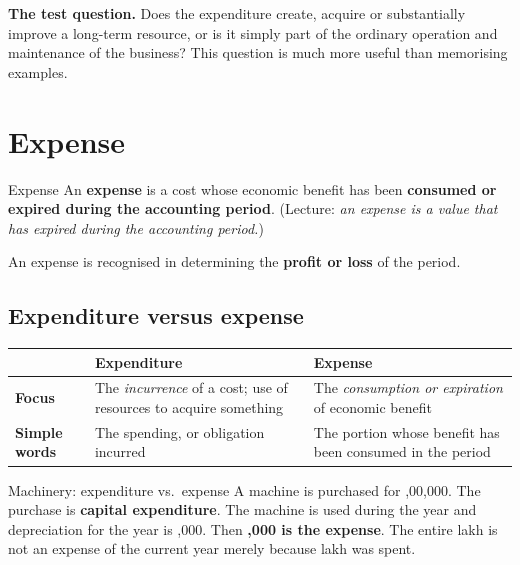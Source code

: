 \documentclass[11pt,a4paper]{article}
\newcommand{\Rs}{\ifmmode\text{\rsfont ₹}\else{\rsfont ₹}\fi}
\begin{document}
\begin{keybox}
\textbf{The test question.} Does the expenditure create, acquire or substantially improve a long-term resource,
or is it simply part of the ordinary operation and maintenance of the business? This question is much more useful
than memorising examples.
\end{keybox}

\section{Expense}

\begin{defbox}{Expense}
An \textbf{expense} is a cost whose economic benefit has been \textbf{consumed or expired during the
accounting period}. (Lecture: \emph{an expense is a value that has expired during the accounting period.})
\end{defbox}

An expense is recognised in determining the \textbf{profit or loss} of the period.

\subsection{Expenditure versus expense}

\begin{center}
\small
\begin{tabularx}{\textwidth}{@{}l Y Y@{}}
\toprule
{} & \textbf{Expenditure} & \textbf{Expense}\\
\midrule
\textbf{Focus} & The \emph{incurrence} of a cost; use of resources to acquire something & The \emph{consumption or expiration} of economic benefit\\
\textbf{Simple words} & The spending, or obligation incurred & The portion whose benefit has been consumed in the period\\
\bottomrule
\end{tabularx}
\end{center}

\begin{exbox}{Machinery: expenditure vs.\ expense}
A machine is purchased for \Rs 6,00,000. The purchase is \textbf{capital expenditure}. The machine is used during
the year and depreciation for the year is \Rs 60,000. Then \textbf{\Rs 60,000 is the expense}. The entire
\Rs 6 lakh is not an expense of the current year merely because \Rs 6 lakh was spent.
\end{exbox}
\end{document}
